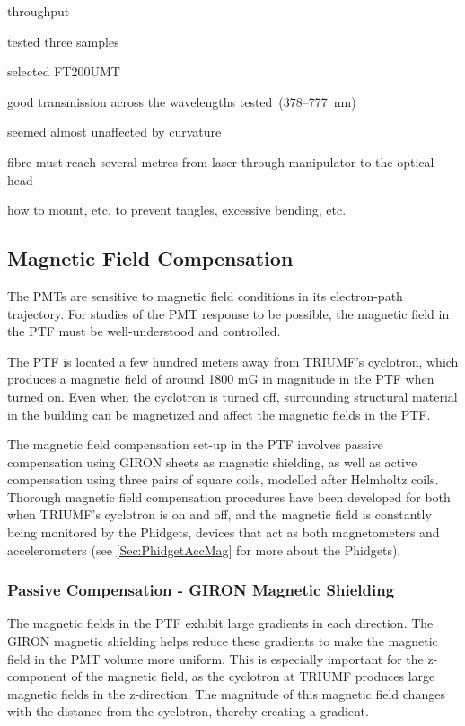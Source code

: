 throughput

tested three samples

selected FT200UMT

good transmission across the wavelengths tested~(378--777~nm)

seemed almost unaffected by curvature

fibre must reach several metres from laser through manipulator to the
optical head

how to mount, etc. to prevent tangles, excessive bending, etc.


\subsection{Magnetic Field Compensation}
\label{Sec:MagFieldCompensation}

The PMTs are sensitive to magnetic field conditions in its electron-path trajectory. For studies of the PMT response to be possible, the magnetic field in the PTF must be well-understood and controlled.

The PTF is located a few hundred meters away from TRIUMF's cyclotron, which produces a magnetic field of around 1800 mG in magnitude in the PTF when turned on. Even when the cyclotron is turned off, surrounding structural material in the building can be magnetized and affect the magnetic fields in the PTF. 

The magnetic field compensation set-up in the PTF involves passive compensation using GIRON sheets as magnetic shielding, as well as active compensation using three pairs of square coils, modelled after Helmholtz coils. Thorough magnetic field compensation procedures have been developed for both when TRIUMF's cyclotron is on and off, and the magnetic field is constantly being monitored by the Phidgets, devices that act as both magnetometers and accelerometers (see \ref{Sec:PhidgetAccMag} for more about the Phidgets). 

\subsubsection{Passive Compensation - GIRON Magnetic Shielding}

The magnetic fields in the PTF exhibit large gradients in each direction. The GIRON magnetic shielding helps reduce these gradients to make the magnetic field in the PMT volume more uniform. This is especially important for the z-component of the magnetic field, as the cyclotron at TRIUMF produces large magnetic fields in the z-direction. The magnitude of this magnetic field changes with the distance from the cyclotron, thereby creating a gradient.

